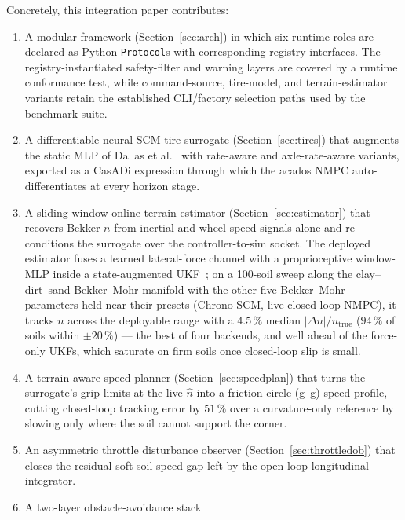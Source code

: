 \documentclass[conference,letterpaper,10pt]{IEEEtran}
\begin{document}
Concretely, this integration paper contributes:
\begin{enumerate}
  \item A modular framework (Section~\ref{sec:arch}) in which six
        runtime roles are declared as Python \texttt{Protocol}s with
        corresponding registry interfaces. The registry-instantiated
        safety-filter and warning layers are covered by a runtime
        conformance test, while command-source, tire-model, and
        terrain-estimator variants retain the established CLI/factory
        selection paths used by the benchmark suite.
  \item A differentiable neural SCM tire surrogate
        (Section~\ref{sec:tires}) that augments the static MLP of
        Dallas et al.~\cite{Dallas21} with rate-aware and
        axle-rate-aware variants, exported as a CasADi expression
        through which the acados NMPC auto-differentiates at every
        horizon stage.
  \item A sliding-window online terrain estimator
        (Section~\ref{sec:estimator}) that recovers Bekker $n$ from
        inertial and wheel-speed signals alone and re-conditions the
        surrogate over the controller-to-sim socket. The deployed
        estimator fuses a learned lateral-force channel with a
        proprioceptive window-MLP inside a state-augmented
        UKF~\cite{Dallas21}; on a 100-soil sweep along the
        clay--dirt--sand Bekker--Mohr manifold with the other five
        Bekker--Mohr parameters held near their presets (Chrono SCM, live
        closed-loop NMPC), it tracks $n$ across the deployable
        range with a $4.5\,\%$ median $|\Delta n|/n_{\mathrm{true}}$
        ($94\,\%$ of soils within $\pm 20\,\%$) --- the best of four
        backends, and well ahead of the force-only UKFs, which
        saturate on firm soils once closed-loop slip is small.
  \item A terrain-aware speed planner (Section~\ref{sec:speedplan})
        that turns the surrogate's grip limits at the live $\hat n$ into
        a friction-circle (g--g) speed profile, cutting closed-loop
        tracking error by $51\,\%$ over a curvature-only reference by
        slowing only where the soil cannot support the corner.
  \item An asymmetric throttle disturbance observer
        (Section~\ref{sec:throttledob}) that closes the residual
        soft-soil speed gap left by the open-loop longitudinal
        integrator.
  \item A two-layer obstacle-avoidance stack

\end{enumerate}
\end{document}
